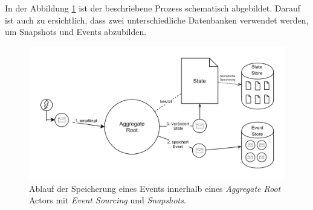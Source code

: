 In der Abbildung \ref{fig:implementation:eventSourcingAggregateRoot} ist der beschriebene Prozess schematisch abgebildet. Darauf ist auch zu ersichtlich, dass zwei unterschiedliche Datenbanken verwendet werden, um Snapshots und Events abzubilden.
\begin{figure}
    \centering
    \includegraphics[width=\linewidth]{gfx/implementation/EventSourcingAkka}
    \caption{Ablauf der Speicherung eines Events innerhalb eines \textit{Aggregate Root} Actors mit \textit{Event Sourcing} und \textit{Snapshots}.}
    \label{fig:implementation:eventSourcingAggregateRoot}
\end{figure} 

